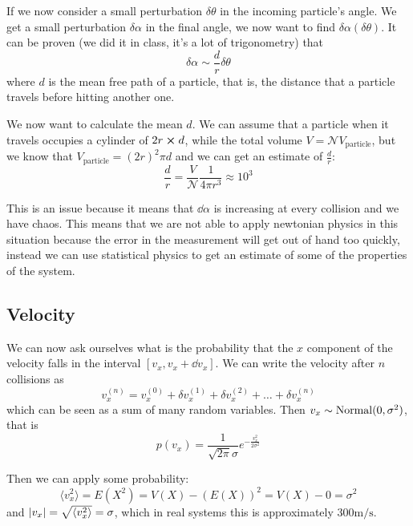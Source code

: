 \documentclass[12pt]{extarticle}
\newcommand{\anglebraces}[1]{
    \langle #1 \rangle
}
\begin{document}
If we now consider a small perturbation $\delta \theta$ in the incoming particle's angle.
We get a small perturbation $\delta \alpha$ in the final angle, we now want to find $\delta \alpha(\delta \theta)$.
It can be proven (we did it in class, it's a lot of trigonometry) that
\begin{equation}
    \delta \alpha \sim \frac{d}{r} \delta \theta
\end{equation}
where $d$ is the mean free path of a particle, that is, the distance that a particle travels before hitting another one.

We now want to calculate the mean $d$.
We can assume that a particle when it travels occupies a cylinder of $2r \cross d$, while the total volume $V = \mathscr{N} V_\text{particle}$, but we know that $V_\text{particle} = (2r)^2 \pi d$ and we can get an estimate of $\frac{d}{r}$:
\begin{equation}
    \frac{d}{r} = \frac{V}{\mathscr{N}} \frac{1}{4 \pi r^3} \approx 10^3
\end{equation}

This is an issue because it means that $\dd{\alpha}$ is increasing at every collision and we have chaos.
This means that we are not able to apply newtonian physics in this situation because the error in the measurement will get out of hand too quickly,
instead we can use statistical physics to get an estimate of some of the properties of the system.

\subsection{Velocity}

We can now ask ourselves what is the probability that the $x$ component of the velocity falls in the interval $[v_x, v_x + \dd{v_x}]$.
We can write the velocity after $n$ collisions as
\begin{equation}
    v_x^{(n)} = v_x^{(0)} + \delta v_x^{(1)} + \delta v_x^{(2)} + \dots +\delta v_x^{(n)}
\end{equation}
which can be seen as a sum of many random variables.
Then $v_x \sim {\operatorfont Normal}(0, \sigma^2)$, that is
\begin{equation}
    p(v_x) = \frac{1}{\sqrt{2 \pi} \sigma} e^{-\frac{v_x^2}{2 \sigma^2}}
\end{equation}

Then we can apply some probability:
\begin{equation}
    \anglebraces{v_x^2} = E(X^2) = V(X) - (E(X))^2 = V(X) - 0 = \sigma^2
\end{equation}
and $\abs{v_x} = \sqrt{\anglebraces{v_x^2}} = \sigma$, which in real systems this is approximately $300 \si{\meter \per \second}$.
\end{document}
